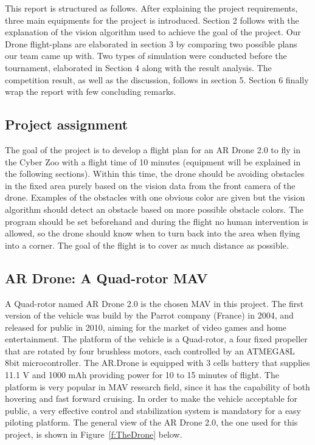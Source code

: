 This report is structured as follows. After explaining the project requirements, three main equipments for the project is introduced. Section 2 follows with the explanation of the vision algorithm used to achieve the goal of the project. Our Drone flight-plans are elaborated in section 3 by comparing two possible plans our team came up with. Two types of simulation were conducted before the tournament, elaborated in Section 4 along with the result analysis. The competition result, as well as the discussion, follows in section 5. Section 6 finally wrap the report with few concluding remarks.

\subsection{Project assignment}
The goal of the project is to develop a flight plan for an AR Drone 2.0 to fly in the Cyber Zoo with a flight time of 10 minutes (equipment will be explained in the following sections). Within this time, the drone should be avoiding obstacles in the fixed area purely based on the vision data from the front camera of the drone. Examples of the obstacles with one obvious color are given but the vision algorithm should detect an obstacle based on more possible obstacle colors. The program should be set beforehand and during the flight no human intervention is allowed, so the drone should know when to turn back into the area when flying into a corner. The goal of the flight is to cover as much distance as possible.

\subsection{AR Drone: A Quad-rotor MAV}
A Quad-rotor named AR Drone 2.0 is the chosen MAV in this project. The first version of the vehicle was build by the Parrot company (France) in 2004, and released for public in 2010, aiming for the market of video games and home entertainment\cite{Bristeau:11}. The platform of the vehicle is a Quad-rotor, a four fixed propeller that are rotated by four brushless motors, each controlled by an ATMEGA8L 8bit microcontroller. The AR.Drone is equipped with 3 cells battery that supplies 11.1 V and 1000 mAh providing power for 10 to 15 minutes of flight. The platform is very popular in MAV research field\cite{Bristeau:11}\cite{Pestana:13}\cite{Lugo:14}, since it has the capability of both hovering and fast forward cruising. In order to make the vehicle acceptable for public, a very effective control and stabilization system is mandatory for a easy piloting platform. The general view of the AR Drone 2.0, the one used for this project, is shown in Figure~\ref{f:TheDrone} below.

